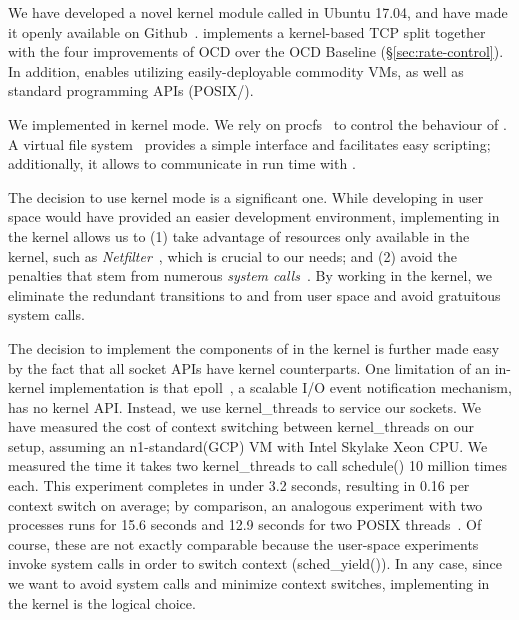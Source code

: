 \label{sec:design}
 We have developed a novel kernel module called \textit{\ksplit} in Ubuntu 17.04, and have made it openly available on Github~\cite{ktcp}. \ksplit implements a kernel-based TCP split together with the four improvements of OCD \name over the OCD Baseline (\S\ref{sec:rate-control}). 
In addition, \ksplit enables utilizing easily-deployable commodity VMs, as well as  standard programming APIs (POSIX/\sockets). %

 We implemented \ksplit in kernel mode. We rely on procfs~\cite{proc} to control the behaviour of \ksplit. A virtual file system~\cite{virtfs} provides a simple interface and facilitates easy scripting; additionally, it allows to communicate in run time with \ksplit.

The decision to use kernel mode is a significant one. While developing in user space would have provided an easier development environment, implementing \ksplit in the kernel allows us to (1) take advantage of resources only available in the kernel, such as \textit{Netfilter}~\cite{netfilter}, which is crucial to our needs; and (2) avoid the penalties that stem from numerous \textit{system calls}~\cite{Copy, FlexSC}. By working in the kernel, we eliminate the redundant transitions to and from user space and avoid gratuitous system calls. 


The decision to implement the components of \ksplit in the kernel is further made easy by the fact that all socket APIs have kernel counterparts. One limitation of an in-kernel implementation is that epoll~\cite{epoll}, a scalable I/O event notification mechanism, has no kernel API. Instead, we use kernel\_threads to service our sockets. 
We have measured the cost of context switching between kernel\_threads on our setup, assuming an n1-standard(GCP) VM with Intel Skylake Xeon CPU. We measured the time it takes two kernel\_threads to call schedule() 10 million times each. This experiment completes in under 3.2 seconds, resulting in 0.16 \usec per context switch on average; by comparison, an analogous experiment with two processes runs for 15.6 seconds and 12.9 seconds for two POSIX threads~\cite{pthreads}.
Of course, these are not exactly comparable because the user-space experiments invoke system calls in order to switch context (sched\_yield()). In any case, since we want to avoid system calls and minimize context switches, implementing \ksplit in the kernel is the logical choice.

